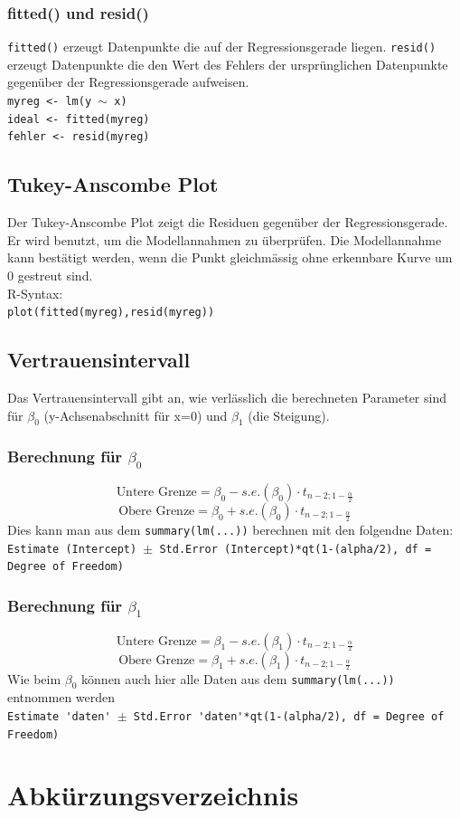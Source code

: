 \subsubsection{fitted() und resid()}
\verb!fitted()! erzeugt Datenpunkte die auf der Regressionsgerade liegen. 
\verb!resid()! erzeugt Datenpunkte die den Wert des Fehlers der ursprünglichen 
Datenpunkte gegenüber der Regressionsgerade aufweisen. \\
\verb!myreg <- lm(y !$\sim$\verb! x)! \\
\verb!ideal <- fitted(myreg)! \\
\verb!fehler <- resid(myreg)!

\subsection{Tukey-Anscombe Plot}
Der Tukey-Anscombe Plot zeigt die Residuen gegenüber der Regressionsgerade. Er 
wird benutzt, um die Modellannahmen zu überprüfen. Die Modellannahme kann 
bestätigt werden, wenn die Punkt gleichmässig ohne erkennbare Kurve um $0$  
gestreut sind. \\
R-Syntax: \\
\verb!plot(fitted(myreg),resid(myreg))!


\subsection{Vertrauensintervall}
Das Vertrauensintervall gibt an, wie verlässlich die berechneten Parameter
sind für $\beta_0$ (y-Achsenabschnitt für x=0) und $\beta_1$ (die Steigung).
\subsubsection{Berechnung für $\beta_0$}
\[ \text{Untere Grenze} = \beta_0 - s.e.(\beta_0)\cdot t_{n-2;1-\frac{\alpha}{2}} \]
\[ \text{Obere Grenze} = \beta_0 + s.e.(\beta_0)\cdot t_{n-2;1-\frac{\alpha}{2}} \]
Dies kann man aus dem \verb!summary(lm(...))! berechnen mit den folgendne Daten:\\
\verb!Estimate (Intercept) !$\pm$\verb! Std.Error (Intercept)*qt(1-(alpha/2), df = Degree of Freedom)!
\subsubsection{Berechnung für $\beta_1$}
\[ \text{Untere Grenze} = \beta_1 - s.e.(\beta_1)\cdot t_{n-2;1-\frac{\alpha}{2}} \]
\[ \text{Obere Grenze} = \beta_1 + s.e.(\beta_1)\cdot t_{n-2;1-\frac{\alpha}{2}} \]
Wie beim $\beta_0$ können auch hier alle Daten aus dem 
\verb!summary(lm(...))! entnommen werden\\
\verb!Estimate 'daten' !$\pm$\verb! Std.Error 'daten'*qt(1-(alpha/2), df = Degree of Freedom)!



\section{Abkürzungsverzeichnis}
\begin{acronym}[SQL]
\end{acronym}


